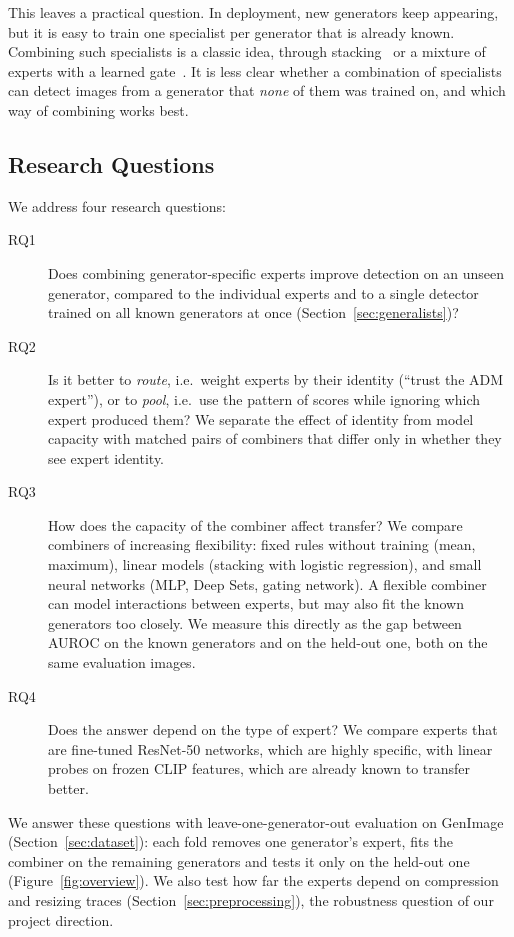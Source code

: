 \documentclass[10pt,a4paper]{article}
\begin{document}
This leaves a practical question. In deployment, new generators keep appearing, but it is easy to train one specialist per generator that is already known. Combining such specialists is a classic idea, through stacking~\cite{wolpert1992stacked} or a mixture of experts with a learned gate~\cite{jacobs1991adaptive}. It is less clear whether a combination of specialists can detect images from a generator that \emph{none} of them was trained on, and which way of combining works best.

\subsection{Research Questions}

We address four research questions:

\begin{description}
  \item[RQ1] Does combining generator-specific experts improve detection on an unseen generator, compared to the individual experts and to a single detector trained on all known generators at once (Section~\ref{sec:generalists})?
  \item[RQ2] Is it better to \emph{route}, i.e.\ weight experts by their identity (``trust the ADM expert''), or to \emph{pool}, i.e.\ use the pattern of scores while ignoring which expert produced them? We separate the effect of identity from model capacity with matched pairs of combiners that differ only in whether they see expert identity.
  \item[RQ3] How does the capacity of the combiner affect transfer? We compare combiners of increasing flexibility: fixed rules without training (mean, maximum), linear models (stacking with logistic regression), and small neural networks (MLP, Deep Sets, gating network). A flexible combiner can model interactions between experts, but may also fit the known generators too closely. We measure this directly as the gap between AUROC on the known generators and on the held-out one, both on the same evaluation images.
  \item[RQ4] Does the answer depend on the type of expert? We compare experts that are fine-tuned ResNet-50 networks, which are highly specific, with linear probes on frozen CLIP features, which are already known to transfer better.
\end{description}

We answer these questions with leave-one-generator-out evaluation on GenImage (Section~\ref{sec:dataset}): each fold removes one generator's expert, fits the combiner on the remaining generators and tests it only on the held-out one (Figure~\ref{fig:overview}). We also test how far the experts depend on compression and resizing traces (Section~\ref{sec:preprocessing}), the robustness question of our project direction.
\end{document}
